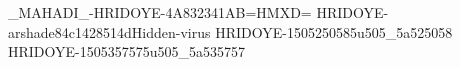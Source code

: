 _MAHADI_-HRIDOYE-4A832341AB=HMXD=
HRIDOYE-arshade84c1428514dHidden-virus
HRIDOYE-1505250585u505_5a525058
HRIDOYE-1505357575u505_5a535757
